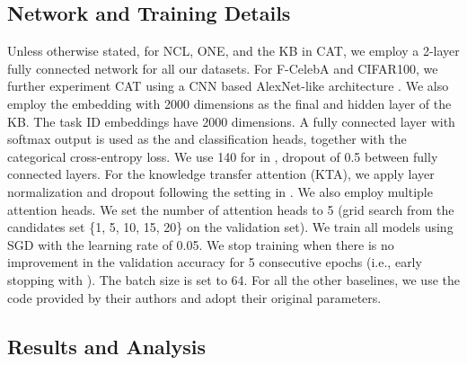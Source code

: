 \documentclass{article}
\begin{document}
\subsection{Network and Training Details}
Unless otherwise stated, for NCL, ONE, and the KB in CAT, {\color{black}we employ a 2-layer fully connected network for all our datasets. For F-CelebA and CIFAR100, we further experiment CAT using a CNN based AlexNet-like architecture \citep{krizhevsky2012imagenet}.} We also employ the embedding with 2000 dimensions as the final and hidden layer of the KB. The task ID embeddings have 2000 dimensions. A fully connected layer with softmax output is used as the  and  classification heads, together with the categorical cross-entropy loss. We use 140 for  in , dropout of 0.5 between fully connected layers. For the knowledge transfer attention (KTA), we apply layer normalization and dropout following the setting in \citep{vaswani2017attention}. We also employ multiple attention heads. We set the number of attention heads to 5 (grid search from the candidates set \{1, 5, 10, 15, 20\} on the validation set). We train all models using SGD with the learning rate of 0.05. We stop training when there is no improvement in the validation accuracy for 5 consecutive epochs (i.e., early stopping with ). The batch size is set to 64. For all the other baselines, we use the code provided by their authors and adopt their original parameters.  























\subsection{Results and Analysis}
\end{document}
